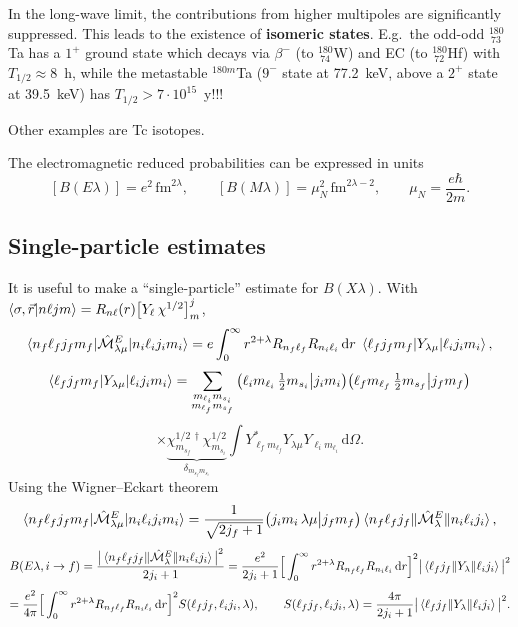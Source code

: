 \documentclass[11pt,a4paper]{article}
\newcommand{\op}[1]{\hat{#1}}
\newcommand{\ud}{\mathrm{d}}
\begin{document}
In the long-wave limit, the contributions from higher multipoles are significantly suppressed. This leads to the existence of \textbf{isomeric states}. E.g.\ the odd-odd ${}^{180}_{\ 73}$Ta has a $1^+$ ground state which decays via $\beta^-$ (to ${}^{180}_{\ 74}$W) and EC (to ${}^{180}_{\ 72}$Hf) with $T_{1/2}\approx8$~h, while the metastable ${}^{180m}$Ta ($9^-$ state at 77.2~keV, above a $2^+$ state at 39.5~keV) has $T_{1/2}>7\cdot10^{15}$~y!!!
\begin{center}
\end{center}
Other examples are Tc isotopes.

The electromagnetic reduced probabilities can be expressed in units
\[
[B(E\lambda)]=e^2\,\text{fm}^{2\lambda},\qquad [B(M\lambda)]=\mu_N^2\,\text{fm}^{2\lambda-2},\qquad \mu_N=\frac{e\hbar}{2m}.
\]

\subsection{Single-particle estimates}
It is useful to make a ``single-particle'' estimate for $B(X\lambda)$. With
$\braket{\sigma,\vec r|n\ell jm}=R_{n\ell}(r)\big[Y_\ell\,\chi^{1/2}\big]^j_m$,
\[
\braket{n_f\ell_fj_fm_f|\op{\mathcal M}^E_{\lambda\mu}|n_i\ell_ij_im_i}
=e\int_0^\infty r^{2+\lambda}R_{n_f\ell_f}R_{n_i\ell_i}\,\ud r\;\braket{\ell_fj_fm_f|Y_{\lambda\mu}|\ell_ij_im_i},
\]
\[
\braket{\ell_fj_fm_f|Y_{\lambda\mu}|\ell_ij_im_i}=\sum_{\substack{m_{\ell_i}m_{s_i}\\m_{\ell_f}m_{s_f}}}\big(\ell_im_{\ell_i}\,\tfrac12m_{s_i}\big|j_im_i\big)\big(\ell_fm_{\ell_f}\,\tfrac12m_{s_f}\big|j_fm_f\big)
\]
\[
\times\underbrace{\chi^{1/2\,\dagger}_{m_{s_f}}\chi^{1/2}_{m_{s_i}}}_{\delta_{m_{s_f}m_{s_i}}}
\int Y^*_{\ell_fm_{\ell_f}}Y_{\lambda\mu}Y_{\ell_im_{\ell_i}}\,\ud\Omega .
\]
Using the Wigner--Eckart theorem
\[
\braket{n_f\ell_fj_fm_f|\op{\mathcal M}^E_{\lambda\mu}|n_i\ell_ij_im_i}=\frac{1}{\sqrt{2j_f+1}}\big(j_im_i\,\lambda\mu\big|j_fm_f\big)\braket{n_f\ell_fj_f\|\op{\mathcal M}^E_\lambda\|n_i\ell_ij_i},
\]
\[
B(E\lambda,i\to f)=\frac{\big|\braket{n_f\ell_fj_f\|\op{\mathcal M}^E_\lambda\|n_i\ell_ij_i}\big|^2}{2j_i+1}
=\frac{e^2}{2j_i+1}\Big[\int_0^\infty r^{2+\lambda}R_{n_f\ell_f}R_{n_i\ell_i}\,\ud r\Big]^2\big|\braket{\ell_fj_f\|Y_\lambda\|\ell_ij_i}\big|^2
\]
\[
=\frac{e^2}{4\pi}\Big[\int_0^\infty r^{2+\lambda}R_{n_f\ell_f}R_{n_i\ell_i}\,\ud r\Big]^2 S(\ell_fj_f,\ell_ij_i,\lambda),
\qquad
S(\ell_fj_f,\ell_ij_i,\lambda)=\frac{4\pi}{2j_i+1}\big|\braket{\ell_fj_f\|Y_\lambda\|\ell_ij_i}\big|^2 .
\]
\end{document}
